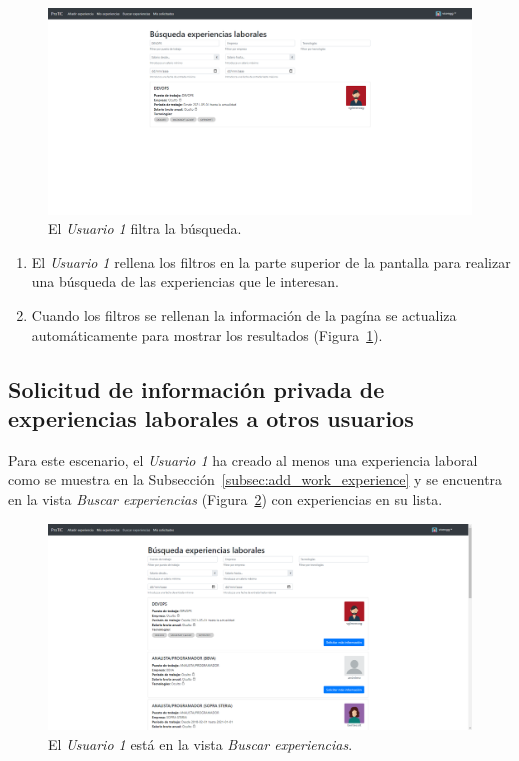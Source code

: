 \documentclass[a4paper, 12pt]{book}
\begin{document}
    \begin{figure}
        \centering
        \includegraphics[width=15cm, keepaspectratio]{img/4.2.png}
        \caption{El \emph{Usuario 1} filtra la búsqueda.}
        \label{fig:use_cases_4_2}
    \end{figure}

    \begin{enumerate}
        \item El \emph{Usuario 1} rellena los filtros en la parte superior de la pantalla para realizar
        una búsqueda de las experiencias que le interesan.
        \item Cuando los filtros se rellenan la información de la pagína se actualiza automáticamente
        para mostrar los resultados (Figura~\ref{fig:use_cases_4_2}).
    \end{enumerate}

    \subsection{Solicitud de información privada de experiencias laborales a otros usuarios}
    \label{subsec:search_work_experiences}
    Para este escenario, el \emph{Usuario 1} ha creado al menos una experiencia laboral como se muestra en la Subsección~\ref{subsec:add_work_experience}
    y se encuentra en la vista \emph{Buscar experiencias} (Figura~\ref{fig:use_cases_5_1}) con experiencias en su lista.

    \begin{figure}
        \centering
        \includegraphics[width=15cm, keepaspectratio]{img/5.1.png}
        \caption{El \emph{Usuario 1} está en la vista \emph{Buscar experiencias}.}
        \label{fig:use_cases_5_1}
    \end{figure}
\end{document}
